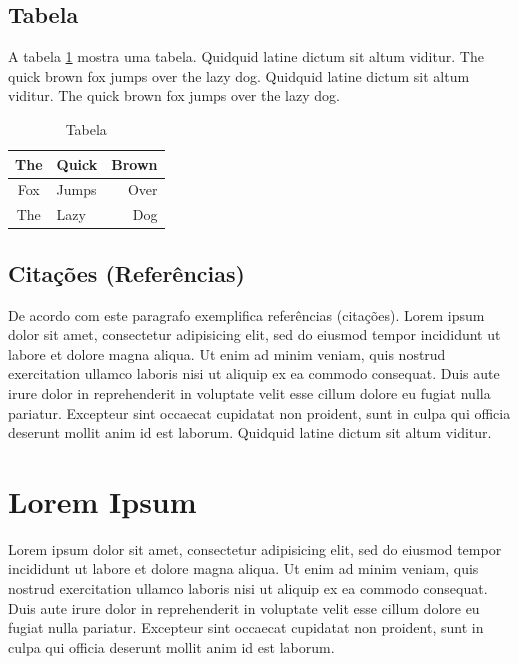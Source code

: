 \subsection{Tabela}

A tabela \ref{tab:tabela} mostra uma tabela. Quidquid latine dictum sit altum
viditur. The quick brown fox jumps over the lazy dog. Quidquid latine dictum
sit altum viditur. The quick brown fox jumps over the lazy dog.

\begin{table}[htbp]
	\caption{Tabela}
	\label{tab:tabela}
	\centering
	\begin{tabular}{|c|l|r|}
		\hline
		The 	&	Quick 	&	Brown	\\
		\hline
		Fox	&	Jumps	&	Over	\\
		The	&	Lazy	&	Dog	\\
		\hline 
	\end{tabular}
\end{table} 


\subsection{Citações (Referências)}

De acordo com \cite{DEAD:1666,BEEF:1234} este paragrafo exemplifica referências
(citações). Lorem ipsum dolor sit amet, consectetur adipisicing elit, sed do
eiusmod tempor incididunt ut labore et dolore magna aliqua. Ut enim ad minim
veniam, quis nostrud exercitation ullamco laboris nisi ut aliquip ex ea commodo
consequat. Duis aute irure dolor in reprehenderit in voluptate velit esse
cillum dolore eu fugiat nulla pariatur. Excepteur sint occaecat cupidatat non
proident, sunt in culpa qui officia deserunt mollit anim id est laborum.
Quidquid latine dictum sit altum viditur.


\section{Lorem Ipsum}

Lorem ipsum dolor sit amet, consectetur adipisicing elit, sed do eiusmod tempor
incididunt ut labore et dolore magna aliqua. Ut enim ad minim veniam, quis
nostrud exercitation ullamco laboris nisi ut aliquip ex ea commodo consequat.
Duis aute irure dolor in reprehenderit in voluptate velit esse cillum dolore eu
fugiat nulla pariatur. Excepteur sint occaecat cupidatat non proident, sunt in
culpa qui officia deserunt mollit anim id est laborum.

